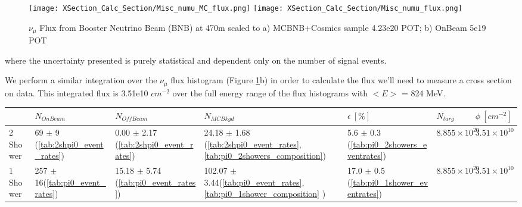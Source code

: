 \begin{figure}[h!]
\centering
\texttt{[image: XSection\_Calc\_Section/Misc\_numu\_MC\_flux.png]}
\texttt{[image: XSection\_Calc\_Section/Misc\_numu\_flux.png]}

\caption{$\nu_\mu$ Flux from Booster Neutrino Beam (BNB) at 470m scaled to a) MCBNB+Cosmics sample 4.23e20 POT; b) OnBeam 5e19 POT}
\label{fig:flux}
\end{figure}

\noindent where the uncertainty presented is purely statistical and dependent only on the number of signal events.  

\par We perform a similar integration over the $\nu_\mu$ flux histogram (Figure \ref{fig:flux}b) in order to calculate the flux we'll need to measure a cross section on data. This integrated flux is 3.51e10 $cm^{-2}$ over the full energy range of the flux histograms with $<E>$ = 824 MeV. 

\begin{table*}
\centering
{}
 \begin{tabular}{|l|l|l|l|l|l|l|}
 \hline
 & $N_{OnBeam}$ & $N_{OffBeam}$ & $N_{MCBkgd}$ & $\epsilon~[\%]$ & $N_{targ}$ & $\phi ~[cm^{-2}]$  \\ [0.1ex] \hline
2 Shower & 69 $\pm$ 9 (\ref{tab:2shpi0_event_rates}) & 0.00 $\pm$ 2.17 (\ref{tab:2shpi0_event_rates}) & 24.18 $\pm$ 1.68 (\ref{tab:2shpi0_event_rates}, \ref{tab:pi0_2showers_composition}) & 5.6 $\pm$ 0.3 (\ref{tab:pi0_2showers_eventrates}) & $8.855\times10^{29}$ & $3.51\times10^{10}$\\ \hline
1 Shower & 257 $\pm$ 16(\ref{tab:pi0_event_rates}) & 15.18 $\pm$ 5.74 (\ref{tab:pi0_event_rates}) & 102.07 $\pm$ 3.44(\ref{tab:pi0_event_rates}, \ref{tab:pi0_1shower_composition} ) & 17.0 $\pm$ 0.5 (\ref{tab:pi0_1shower_eventrates}) & $8.855\times10^{29}$ & $3.51\times10^{10}$\\ \hline

\end{tabular}
\end{table*}

